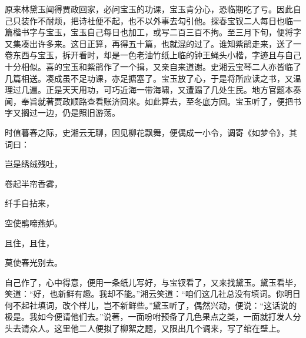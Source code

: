 \begin{parag}
    原来林黛玉闻得贾政回家，必问宝玉的功课，宝玉肯分心，恐临期吃了亏。因此自己只装作不耐烦，把诗社便不起，也不以外事去勾引他。探春宝钗二人每日也临一篇楷书字与宝玉，宝玉自己每日也加工，或写二百三百不拘。至三月下旬，便将字又集凑出许多来。这日正算，再得五十篇，也就混的过了。谁知紫鹃走来，送了一卷东西与宝玉，拆开看时，却是一色老油竹纸上临的钟王蝇头小楷，字迹且与自己十分相似。喜的宝玉和紫鹃作了一个揖，又亲自来道谢。史湘云宝琴二人亦皆临了几篇相送。凑成虽不足功课，亦足搪塞了。宝玉放了心，于是将所应读之书，又温理过几遍。正是天天用功，可巧近海一带海啸，又遭蹋了几处生民。地方官题本奏闻，奉旨就著贾政顺路查看账济回来。如此算去，至冬底方回。宝玉听了，便把书字又搁过一边，仍是照旧游荡。
\end{parag}


\begin{parag}
    时值暮春之际，史湘云无聊，因见柳花飘舞，便偶成一小令，调寄《如梦令》，其词曰：
\end{parag}


\begin{poem}
    \begin{pl}岂是绣绒残吐，\end{pl}

    \begin{pl}卷起半帘香雾，\end{pl}

    \begin{pl}纤手自拈来，\end{pl}

    \begin{pl}空使鹃啼燕妒。\end{pl}

    \begin{pl}且住，且住，\end{pl}

    \begin{pl}莫使春光别去。\end{pl}


\end{poem}


\begin{parag}
    自己作了，心中得意，便用一条纸儿写好，与宝钗看了，又来找黛玉。黛玉看毕，笑道：“好，也新鲜有趣。我却不能。”湘云笑道：“咱们这几社总没有填词。你明日何不起社填词，改个样儿，岂不新鲜些。”黛玉听了，偶然兴动，便说：“这话说的极是。我如今便请他们去。”说著，一面吩咐预备了几色果点之类，一面就打发人分头去请众人。这里他二人便拟了柳絮之题，又限出几个调来，写了绾在壁上。
\end{parag}


